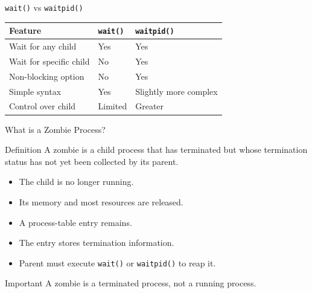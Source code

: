 \documentclass[aspectratio=169]{beamer}
\begin{document}
\begin{frame}{\texttt{wait()} vs \texttt{waitpid()}}

\begin{center}

\begin{tabular}{|p{4cm}|p{4cm}|p{4cm}|}
\hline

\textbf{Feature}
&
\textbf{\texttt{wait()}}
&
\textbf{\texttt{waitpid()}}
\\
\hline

Wait for any child
&
Yes
&
Yes
\\
\hline

Wait for specific child
&
No
&
Yes
\\
\hline

Non-blocking option
&
No
&
Yes
\\
\hline

Simple syntax
&
Yes
&
Slightly more complex
\\
\hline

Control over child
&
Limited
&
Greater
\\
\hline

\end{tabular}

\end{center}

\end{frame}

\begin{frame}{What is a Zombie Process?}

\begin{block}{Definition}
A zombie is a child process that has terminated but whose termination status
has not yet been collected by its parent.
\end{block}

\begin{itemize}

    \item The child is no longer running.

    \item Its memory and most resources are released.

    \item A process-table entry remains.

    \item The entry stores termination information.

    \item Parent must execute \texttt{wait()} or \texttt{waitpid()} to reap it.

\end{itemize}

\begin{alertblock}{Important}
A zombie is a terminated process, not a running process.
\end{alertblock}

\end{frame}
\end{document}
